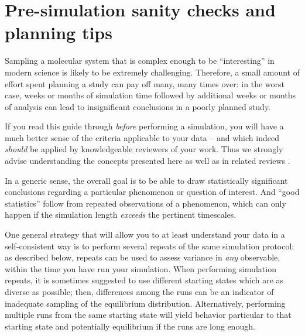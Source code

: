 \section{Pre-simulation sanity checks and planning tips}
\label{sec:sanity}

Sampling a molecular system that is complex enough to be ``interesting'' in modern science is likely to be extremely challenging.
Therefore, a small amount of effort spent planning a study can pay off many, many times over: in the worst case, weeks or months of simulation time followed by additional weeks or months of analysis can lead to insignificant conclusions in a poorly planned study.

If you read this guide through \emph{before} performing a simulation, you will have a much better sense of the criteria applicable to your data -- and which indeed \emph{should} be applied by knowledgeable reviewers of your work.
Thus we strongly advise understanding the concepts presented here as well as in related reviews \cite{Grossfield2009,JCGM:GUM2008}.

In a generic sense, the overall goal is to be able to draw statistically significant conclusions regarding a particular phenomenon or question of interest.
And ``good statistics'' follow from repeated observations of a phenomenon, which can only happen if the simulation length \emph{exceeds} the pertinent timescales.

One general strategy that will allow you to at least understand your data in a self-consistent way is to perform several repeats of the same simulation protocol: as described below, repeats can be used to assess variance in \emph{any} observable, within the time you have run your simulation.
When performing simulation repeats, it is sometimes suggested to use different starting states which are as diverse as possible; then, differences among the runs can be an indicator of inadequate sampling of the equilibrium distribution.
Alternatively, performing multiple runs from the same starting state will yield behavior particular to that starting state and potentially equilibrium if the runs are long enough.

